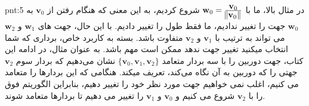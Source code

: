 {\begin{spacing}{1.5}
        \begin{point}{pnt:5}
            \Large
            در مثال بالا، ما با $\textbf{w}_{0}=\frac{\displaystyle\textbf{v}_{0}}{\displaystyle\norm{\textbf{v}_{0}}}$ شروع کردیم، به این معنی که هنگام رفتن از $\textbf{v}_{0}$ به $\textbf{w}_{0}$ جهت را تغییر ندادیم،
            ما فقط طول را تغییر دادیم.
            با این حال، جهت های $\textbf{w}_{1}$ و $\textbf{w}_{2}$ می تواند به ترتیب با $\textbf{v}_{1}$ و $\textbf{v}_{2}$ متفاوت باشد.
            بسته به کاربرد خاص، برداری که شما انتخاب میکنید تغییر جهت ندهد ممکن است مهم باشد.
            به عنوان مثال، در ادامه این کتاب، جهت دوربین را با سه بردار متعامد $\{\textbf{v}_{0},\textbf{v}_{1},\textbf{v}_{2}\}$ نشان می‌دهیم که بردار سوم $\textbf{v}_{2}$ جهتی را که دوربین به آن نگاه می‌کند، تعریف میکند.
            هنگامی که این بردارها را متعامد می کنیم، اغلب نمی خواهیم جهت مورد نظر خود را تغییر دهیم،
            بنابراین الگوریتم فوق را با $\textbf{v}_{2}$ شروع می کنیم و $\textbf{v}_{0}$ و $\textbf{v}_{1}$ را تغییر می دهیم تا بردارها متعامد شوند.
        \end{point}
    \end{spacing}
}

